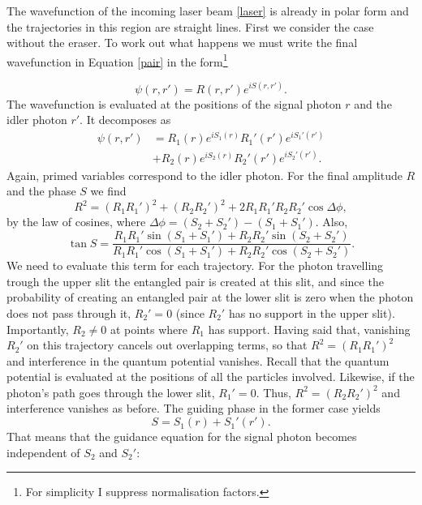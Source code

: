 \documentclass[12pt]{article}
\numberwithin{equation}{section}
\begin{document}
The wavefunction of the incoming laser beam \ref{laser} is already in polar form and the trajectories in this region are straight lines. First we consider the case without the eraser. To work out what happens we must write the final wavefunction in Equation \ref{pair} in the form\footnote{For simplicity I suppress normalisation factors.}

\begin{equation}
\psi(r,r')= R(r,r')e^{iS(r,r')}.
\end{equation} The wavefunction is evaluated at the positions of the signal photon $r$ and the idler photon $r'$. It decomposes as 
\begin{align}
\psi(r,r')&=R_1(r)e^{iS_1(r)}
R_1'(r')e^{iS_1'(r')}\nonumber\\
&+R_2(r)e^{iS_2(r)} R_2'(r')e^{iS_2'(r')}.
\end{align} Again, primed variables correspond to the idler photon. For the final amplitude $R$ and the phase $S$ we find
\begin{equation}
R^2 =(R_1R_1')^2 + (R_2R_2')^2 + 2R_1R_1'R_2R_2'\cos\Delta \phi,
\end{equation} by the law of cosines, where $\Delta\phi=(S_2+S_2')-(S_1+S_1')$. Also, 
\begin{equation}
\tan S = \frac{R_1R_1'\sin(S_1+S_1')+R_2R_2'\sin(S_2+S_2')}{R_1R_1'\cos(S_1+S_1')+R_2R_2'\cos(S_2+S_2')}.
\end{equation}
We need to evaluate this term for each trajectory. For the photon travelling trough the upper slit the entangled pair is created at this slit, and since the probability of creating an entangled pair at the lower slit is zero when the photon does not pass through it, $R_2'=0$ (since $R_2'$ has no support in the upper slit). Importantly, $R_2\neq 0$ at points where $R_1$ has support. Having said that, vanishing $R_2'$ on this trajectory cancels out overlapping terms, so that $R^2=(R_1R_1')^2$ and interference in the quantum potential vanishes. Recall that the quantum potential is evaluated at the positions of all the particles involved. Likewise, if the photon's path goes through the lower slit, $R_1'=0$. Thus, $R^2=(R_2R_2')^2$ and interference vanishes as before. The guiding phase in the former case yields
\begin{equation}
S= S_1(r)+S_1'(r').
\end{equation} That means that the guidance equation for the signal photon becomes independent of $S_2$ and $S_2'$:
\end{document}
